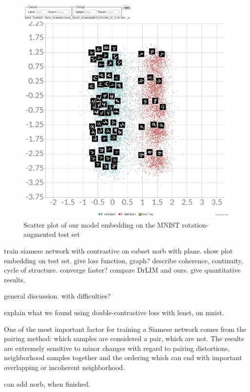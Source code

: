 \documentclass[a4paper,12pt]{report}
\begin{document}
\begin{figure}[t]
    \begin{center}
        \includegraphics{thesis_figures/mnist_cl2d_rotate.jpg}
    \end{center}
    \caption{Scatter plot of our model embedding on the MNIST rotation-augmented test set}
    \label{fig:mnist_cl2d_rotate}
\end{figure}

train siamese network with contrastive on subset norb with plane.
show plot embedding on test set.
give loss function, graph?
describe coherence, continuity, cycle of structure.
converge faster?
compare DrLIM and ours.
give quantitative results.

general discussion.
with difficulties?

explain what we found using double-contrastive loss with lenet, on mnist.

One of the most important factor for training a Siamese network comes from the pairing method: which samples are considered a pair, which are not.
The results are extremely sensitive to minor changes with regard to pairing distortions, neighborhood samples together and the ordering which can end with important overlapping or incoherent neighborhood.

can add norb, when finished.
\end{document}
